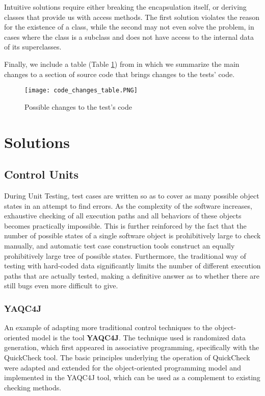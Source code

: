 \documentclass[12pt]{article}
\begin{document}
\par Intuitive solutions require either breaking the encapsulation itself, or deriving classes that provide us with access methods. The first solution violates the reason for the existence of a class, while the second may not even solve the problem, in cases where the class is a subclass and does not have access to the internal data of its superclasses.\newline 

\par Finally, we include a table (Table \ref{fig:panos}) from \textcite{kung} in which we summarize the main changes to a section of source code that brings changes to the tests' code.

\begin{figure}
\label{fig:panos}
\caption{Possible changes to the test's code}
\texttt{[image: code\_changes\_table.PNG]}
\end{figure}

\section{Solutions}

\subsection{Control Units}
During Unit Testing, test cases are written so as to cover as many possible object states in an attempt to find errors. As the complexity of the software increases, exhaustive checking of all execution paths and all behaviors of these objects becomes practically impossible. This is further reinforced by the fact that the number of possible states of a single software object is prohibitively large to check manually, and automatic test case construction tools construct an equally prohibitively large tree of possible states. Furthermore, the traditional way of testing with hard-coded data significantly limits the number of different execution paths that are actually tested, making a definitive answer as to whether there are still bugs even more difficult to give.

\subsubsection{YAQC4J}

An example of adapting more traditional control techniques to the object-oriented model is the tool \textbf{YAQC4J}. The technique used is randomized data generation, which first appeared in associative programming, specifically with the QuickCheck \cite{quickcheck} tool. The basic principles underlying the operation of QuickCheck were adapted and extended for the object-oriented programming model and implemented in the YAQC4J tool, which can be used as a complement to existing checking methods.
\end{document}
